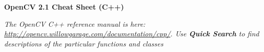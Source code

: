 \documentclass[10pt,landscape]{article}
\makeatletter
\renewcommand{\section}{\@startsection{section}{1}{0mm}%
                                {-1ex plus -.5ex minus -.2ex}%
                                {0.5ex plus .2ex}%
                                {\normalfont\large\bfseries}}
\makeatother
\begin{document}
\raggedright
\footnotesize
\begin{multicols}{3}


\setlength{\premulticols}{1pt}
\setlength{\postmulticols}{1pt}
\setlength{\multicolsep}{1pt}
\setlength{\columnsep}{2pt}

\begin{center}
     \Large{\textbf{OpenCV 2.1 Cheat Sheet (C++)}} \\
\end{center}
\newlength{\MyLen}


\emph{The OpenCV C++ reference manual is here: \url{http://opencv.willowgarage.com/documentation/cpp/}. Use \textbf{Quick Search} to find descriptions of the particular functions and classes}


\end{multicols}
\end{document}
